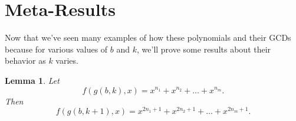 \documentclass{article}
\newtheorem{lemma}{Lemma}
\begin{document}
	\newpage
	\section{Meta-Results}
	Now that we've seen many examples of how these polynomials and their GCDs because for various values of $b$ and $k$, we'll prove some results about their behavior as $k$ varies.
	
	\begin{lemma}
		Let
		\begin{equation*}
			f(g(b,k),x) = x^{n_1} + x^{n_2} + \dots + x^{n_m}.
		\end{equation*}
		Then
		\begin{equation*}
			f(g(b,k+1),x) = x^{2n_1 + 1} + x^{2n_2 + 1} + \dots + x^{2n_m + 1}.
		\end{equation*}
	\end{lemma}
\end{document}
